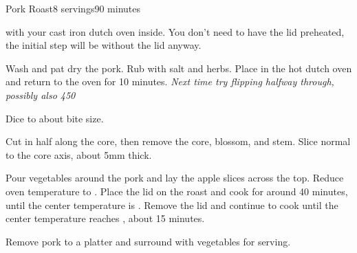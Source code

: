 \documentclass[../Cookbook.tex]{subfiles}
\begin{document}
\begin{recipe}[PorkRoast]{Pork Roast}{8 servings}{90 minutes}

 with your cast iron dutch oven inside.
You don't need to have the lid preheated, the initial step will be without the lid anyway.

Wash and pat dry the pork.
Rub with salt and herbs.
Place in the hot dutch oven and return to the oven for 10 minutes.
\textit{Next time try flipping halfway through, possibly also 450}

Dice to about bite size.

Cut in half along the core, then remove the core, blossom, and stem.
Slice normal to the core axis, about 5mm thick.

\newstep
Pour vegetables around the pork and lay the apple slices across the top.
Reduce oven temperature to .
Place the lid on the roast and cook for around 40 minutes, until the center temperature is .
Remove the lid and continue to cook until the center temperature reaches , about 15 minutes.

Remove pork to a platter and surround with vegetables for serving.

\end{recipe}
\end{document}

